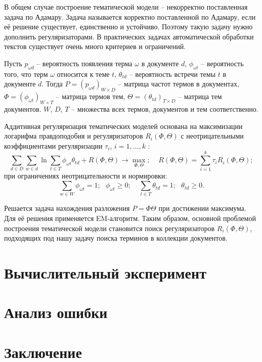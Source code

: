 \documentclass[a4paper, 12pt]{article}
\begin{document}
        В общем случае построение тематической модели – некорректно поставленная задача по Адамару. Задача называется корректно поставленной по Адамару, если её решение существует, единственно и устойчиво. Поэтому такую задачу  нужно дополнить регуляризаторами. В практических задачах автоматической обработки текстов существует очень много критериев и ограничений.

        Пусть $p_{\omega d}$ -- вероятность появления терма $\omega$ в документе $d$, $\phi_{\omega t}$ -- вероятность того, что терм $\omega$ относится к теме $t$, $\theta_{td}$ -- вероятность встречи темы $t$ в документе $d$. Тогда $P = (p_{\omega d})_{W \times D}$ -- матрица частот термов в документах, $\Phi = (\phi_{\omega t})_{W \times T}$ -- матрица термов тем, $\Theta = (\theta_{td})_{T \times D}$ -- матрица тем документов. $W$, $D$, $T$ -- множества всех термов, документов и тем соответственно.
       
        Аддитивная регуляризация тематических моделей основана на максимизации логарифма правдоподобия и регуляризаторов $R_i(\Phi, \Theta)$ с неотрицательными коэффициентами регуляризации $\tau_i$, $i = 1, ..., k$ \citep{vorontsov2020}:
        \begin{equation}
            \sum\limits_{d \in D}\sum\limits_{w \in d}\ln\sum\limits_{t \in T}\phi_{\omega t}\theta_{td} + R(\Phi, \Theta) \to \max\limits_{\Phi, \Theta}; ~~~~~ R(\Phi, \Theta) = \sum\limits_{i = 1}^k\tau_iR_i(\Phi, \Theta);
        \end{equation}
        при ограничениях неотрицательности и нормировки:
        \begin{equation}
            \sum\limits_{w \in W}\phi_{\omega t} = 1; ~~~ \phi_{\omega t} \geq 0; ~~~~~ \sum\limits_{t \in T}\theta_{td} = 1; ~~~ \theta_{td} \geq 0.
        \end{equation}

        Решается задача нахождения разложения $P = \Phi\Theta$ при достижении максимума. Для её решения применяется EM-алгоритм. Таким образом, основной проблемой построения тематической модели становится поиск регуляризаторов $R_i(\Phi, \Theta)$, подходящих под нашу задачу поиска терминов в коллекции документов.

\section{Вычислительный эксперимент}

\section{Анализ ошибки}

\section{Заключение}



\end{document}
